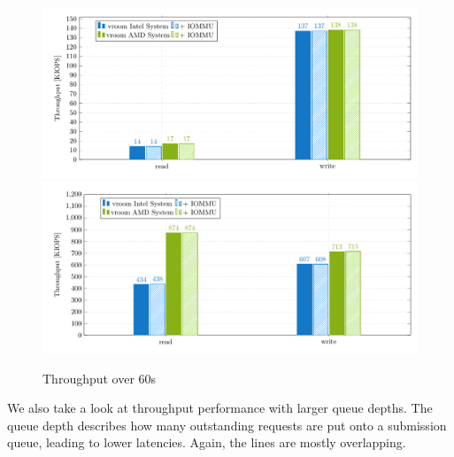 \begin{figure}[H]
  \centering
   {\includegraphics[width=.9\textwidth]{figures/throughput_bar_qd1t1} \label{fig:throughput-qd1t1}}
   {\includegraphics[width=.9\textwidth]{figures/throughput_bar_qd32t4} \label{fig:throughput-qd32t4}}
  \caption{Throughput over 60s}
  \label{fig:throughput-bar}
\end{figure}


We also take a look at throughput performance with larger queue depths. The queue depth describes how many outstanding requests are put onto a submission queue, leading to lower latencies. Again, the lines are mostly overlapping.


